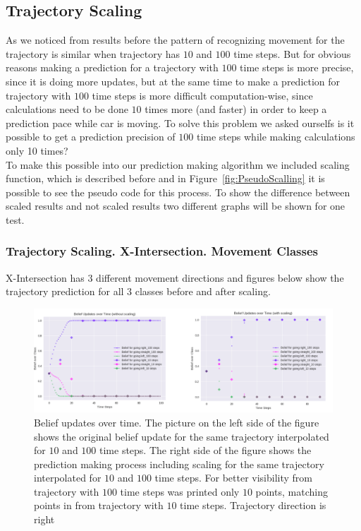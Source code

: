 \subsection{Trajectory Scaling}

As we noticed from results before the pattern of recognizing movement for the trajectory is similar when trajectory has $10$ and $100$ time steps. But for obvious reasons making a prediction for a trajectory with $100$ time steps is more precise, since it is doing more updates, but at the same time to make a prediction for trajectory with $100$ time steps is more difficult computation-wise, since calculations need to be done $10$ times more (and faster) in order to keep a prediction pace while car is moving. To solve this problem we asked ourselfs is it possible to get a prediction precision of $100$ time steps while making calculations only 10 times? \\
To make this possible into our prediction making algorithm we included scaling function, which is described before and in Figure~\ref{fig:PseudoScalling} it is possible to see the pseudo code for this process. To show the difference between scaled results and not scaled results two different graphs will be shown for one test.

\subsubsection{Trajectory Scaling. X-Intersection. Movement Classes}

 X-Intersection has $3$ different movement directions and figures below show the trajectory prediction for all $3$ classes before and after scaling.

\begin{figure}[H]
	\centering  	
	\includegraphics[width=13cm]{img/ScalingRightX.png}
	\caption{Belief updates over time. The picture on the left side of the figure shows the original belief update for the same trajectory interpolated for $10$ and $100$ time steps. The right side of the figure shows the prediction making process including scaling for the same trajectory interpolated for $10$ and $100$ time steps. For better visibility from trajectory with $100$ time steps was printed only $10$ points, matching points in from trajectory with  $10$ time steps. Trajectory direction is right}
	\label{fig:ScallingRightX}    
\end{figure}

